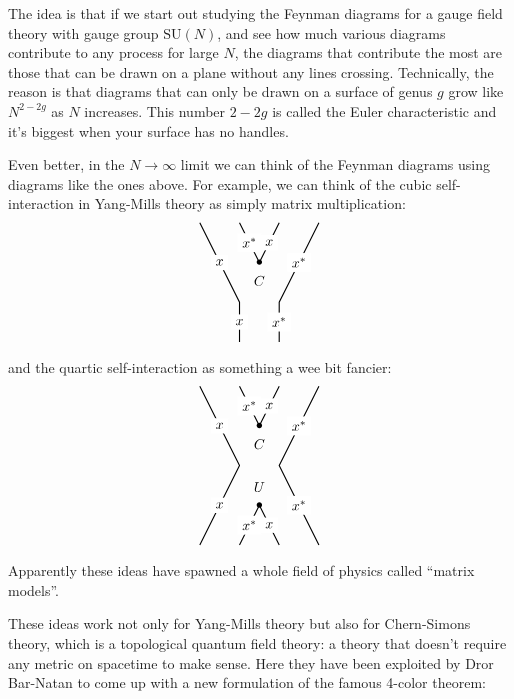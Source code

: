 \documentclass{article}
\def\tightlist{}
\renewcommand{\texttt}[1]{%
  \begingroup
  \ttfamily
  \begingroup\lccode`~=`/\lowercase{\endgroup\def~}{/\discretionary{}{}{}}%
  \begingroup\lccode`~=`[\lowercase{\endgroup\def~}{[\discretionary{}{}{}}%
  \begingroup\lccode`~=`.\lowercase{\endgroup\def~}{.\discretionary{}{}{}}%
  \catcode`/=\active\catcode`[=\active\catcode`.=\active
  \scantokens{#1\noexpand}%
  \endgroup
}
\begin{document}
The idea is that if we start out studying the Feynman diagrams for a
gauge field theory with gauge group \(\mathrm{SU}(N)\), and see how much
various diagrams contribute to any process for large \(N\), the diagrams
that contribute the most are those that can be drawn on a plane without
any lines crossing. Technically, the reason is that diagrams that can
only be drawn on a surface of genus \(g\) grow like \(N^{2-2g}\) as
\(N\) increases. This number \(2-2g\) is called the Euler characteristic
and it's biggest when your surface has no handles.

Even better, in the \(N\to\infty\) limit we can think of the Feynman
diagrams using diagrams like the ones above. For example, we can think
of the cubic self-interaction in Yang-Mills theory as simply matrix
multiplication: \[
  \begin{tikzpicture}
    \draw[thick] (1,0) to node[fill=white]{$x^*$} (1.5,-1) node[label=below:{$C$}]{$\bullet$} to node[fill=white]{$x$} (2,0);
    \draw[thick] (0,0) to node[fill=white]{$x$} (1,-2) to node[fill=white]{$x$} (1,-3);
    \draw[thick] (3,0) to node[fill=white]{$x^*$} (2,-2) to node[fill=white]{$x^*$} (2,-3);
  \end{tikzpicture}
\] and the quartic self-interaction as something a wee bit fancier: \[
  \begin{tikzpicture}
    \draw[thick] (1,0) to node[fill=white]{$x^*$} (1.5,-1) node[label=below:{$C$}]{$\bullet$} to node[fill=white]{$x$} (2,0);
    \draw[thick] (0,0) to node[fill=white]{$x$} (1,-2) to node[fill=white]{$x$} (0,-4);
    \draw[thick] (3,0) to node[fill=white]{$x^*$} (2,-2) to node[fill=white]{$x^*$} (3,-4);
    \draw[thick] (1,-4) to node[fill=white]{$x^*$} (1.5,-3) node[label=above:{$U$}]{$\bullet$} to node[fill=white]{$x$} (2,-4);
  \end{tikzpicture}
\] Apparently these ideas have spawned a whole field of physics called
``matrix models''.

These ideas work not only for Yang-Mills theory but also for
Chern-Simons theory, which is a topological quantum field theory: a
theory that doesn't require any metric on spacetime to make sense. Here
they have been exploited by Dror Bar-Natan to come up with a new
formulation of the famous 4-color theorem:

\end{document}
